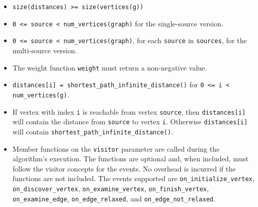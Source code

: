 \begin{itemdescr}
      \pnum\hardprecond
            \begin{itemize}
                  \item \lstinline{size(distances) >= size(vertices(g))}
                  \item
                        \lstinline{0 <= source < num_vertices(graph)} for the single-source version. 
                  \item
                        \lstinline{0 <= source < num_vertices(graph)}, for each \lstinline{source} in \lstinline{sources}, 
                                   for the multi-source version.
            \end{itemize}
      \pnum\preconditions
            \begin{itemize}
                  \item
                        The weight function \lstinline{weight} must return a non-negative value.
                  \item
                        \lstinline{distances[i] = shortest_path_infinite_distance()} for \lstinline{0 <= i < num_vertices(g)}.
            \end{itemize}
      \pnum\effects
            \begin{itemize}
                  \item
                        If vertex with index \lstinline{i} is reachable from vertex \lstinline{source}, then
                        \lstinline{distances[i]} will contain the distance from \lstinline{source} to vertex
                        \lstinline{i}.  Otherwise \lstinline{distances[i]} will contain
                        \lstinline{shortest_path_infinite_distance()}.
                  \item Member functions on the \lstinline{visitor} parameter are called during the algorithm's execution.
                        The functions are optional and, when included, must follow the visitor concepts for the events.
                        No overhead is incurred if the functions are not included.
                        The events supported are \lstinline{on_initialize_vertex}, \lstinline{on_discover_vertex},
                        \lstinline{on_examine_vertex}, \lstinline{on_finish_vertex}, \lstinline{on_examine_edge},
                        \lstinline{on_edge_relaxed}, and \lstinline{on_edge_not_relaxed}.
            \end{itemize}

\end{itemdescr}
